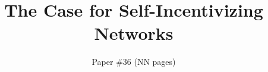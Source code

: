 \documentclass{hotnets15}
\begin{document}
 {}
\date{}


\title{The Case for Self-Incentivizing Networks}

\author{Paper \#36 (NN pages)}

\maketitle









 
\begin{small}

\end{small}
\label{last-page}
\end{document}
